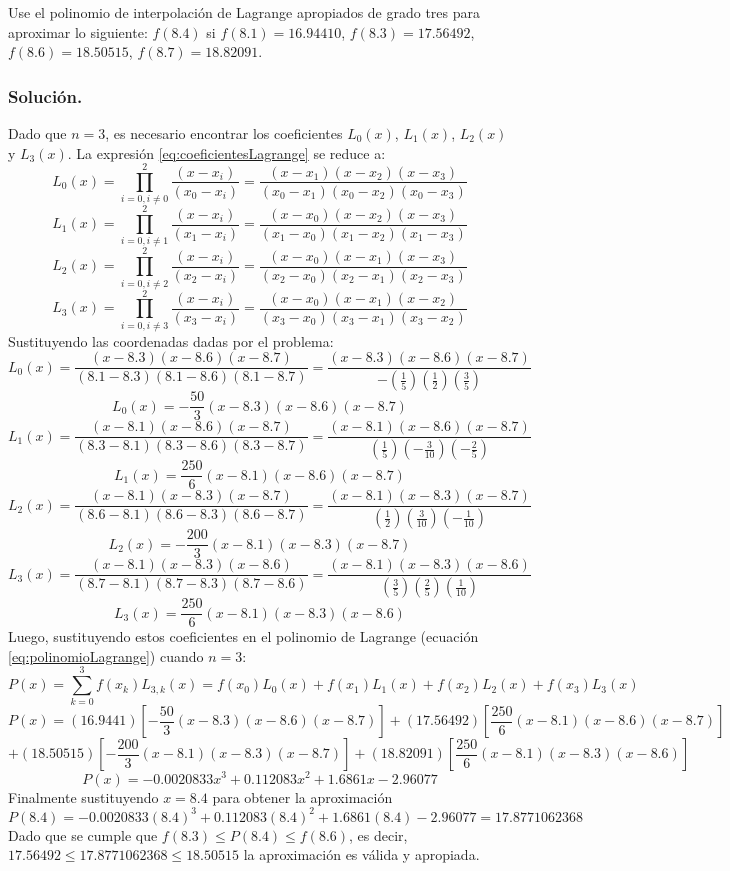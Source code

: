 \begin{exerciseT}
	Use el polinomio de interpolación de Lagrange apropiados de grado tres para aproximar lo siguiente: $f(8.4)$ si 
	$f(8.1)=16.94410$, $f(8.3)=17.56492$, $f(8.6)=18.50515$, $f(8.7)=18.82091$.
	\subsubsection*{Solución.} Dado que $n=3$, es necesario encontrar los coeficientes $L_0(x)$, $L_1(x)$, $L_2(x)$ y $L_3(x)$. 
	La expresión \ref{eq:coeficientesLagrange} 
		se reduce a:
			$$L_0(x) = \prod_{i=0, i\not= 0}^{2} \dfrac{(x-x_i)}{(x_0 - x_i)} = \dfrac{(x-x_1)(x-x_2)(x-x_3)}{(x_0-x_1)(x_0-x_2)(x_0-x_3)}$$	
			$$L_1(x) = \prod_{i=0, i\not= 1}^{2} \dfrac{(x-x_i)}{(x_1 - x_i)} = \dfrac{(x-x_0)(x-x_2)(x-x_3)}{(x_1-x_0)(x_1-x_2)(x_1-x_3)}$$	
			$$L_2(x) = \prod_{i=0, i\not= 2}^{2} \dfrac{(x-x_i)}{(x_2 - x_i)} = \dfrac{(x-x_0)(x-x_1)(x-x_3)}{(x_2-x_0)(x_2-x_1)(x_2-x_3)}$$
			$$L_3(x) = \prod_{i=0, i\not= 3}^{2} \dfrac{(x-x_i)}{(x_3 - x_i)} = \dfrac{(x-x_0)(x-x_1)(x-x_2)}{(x_3-x_0)(x_3-x_1)(x_3-x_2)}$$
		Sustituyendo las coordenadas dadas por el problema:
			$$L_0(x) = \dfrac{(x-8.3)(x-8.6)(x-8.7)}{(8.1-8.3)(8.1-8.6)(8.1-8.7)} = \dfrac{(x-8.3)(x-8.6)(x-8.7)}{-(\frac{1}{5})(\frac{1}{2})(\frac{3}{5})}$$
			$$L_0(x) = -\frac{50}{3}(x-8.3)(x-8.6)(x-8.7)$$
			$$L_1(x) = \dfrac{(x-8.1)(x-8.6)(x-8.7)}{(8.3-8.1)(8.3-8.6)(8.3-8.7)} = \dfrac{(x-8.1)(x-8.6)(x-8.7)}{(\frac{1}{5})(-\frac{3}{10})(-\frac{2}{5})}$$
			$$L_1(x) = \frac{250}{6}(x-8.1)(x-8.6)(x-8.7)$$
			$$L_2(x) = \dfrac{(x-8.1)(x-8.3)(x-8.7)}{(8.6-8.1)(8.6-8.3)(8.6-8.7)} = \dfrac{(x-8.1)(x-8.3)(x-8.7)}{(\frac{1}{2})(\frac{3}{10})(-\frac{1}{10})}$$
			$$L_2(x) = -\frac{200}{3}(x-8.1)(x-8.3)(x-8.7)$$
			$$L_3(x) = \dfrac{(x-8.1)(x-8.3)(x-8.6)}{(8.7-8.1)(8.7-8.3)(8.7-8.6)} = \dfrac{(x-8.1)(x-8.3)(x-8.6)}{(\frac{3}{5})(\frac{2}{5})(\frac{1}{10})}$$
			$$L_3(x) = \frac{250}{6}(x-8.1)(x-8.3)(x-8.6)$$	
		Luego, sustituyendo estos coeficientes en el polinomio de Lagrange (ecuación \ref{eq:polinomioLagrange}) cuando $n=3$:
			$$P(x) = \sum_{k=0}^3 f(x_k)L_{3,k}(x) = f(x_0)L_0(x) + f(x_1)L_1(x) + f(x_2)L_2(x) + f(x_3)L_3(x)$$
			$$P(x) = (16.9441)\left[-\frac{50}{3} (x-8.3)(x-8.6)(x-8.7) \right] + (17.56492)\left[\frac{250}{6} (x-8.1)(x-8.6)(x-8.7) \right]$$
			$$+ (18.50515)\left[-\frac{200}{3} (x-8.1)(x-8.3)(x-8.7) \right] + (18.82091)\left[\frac{250}{6} (x-8.1)(x-8.3)(x-8.6) \right]$$
			$$P(x) = -0.0020833x^3 + 0.112083x^2 + 1.6861x - 2.96077$$
		Finalmente sustituyendo $x=8.4$ para obtener la aproximación
			$$P(8.4) = -0.0020833(8.4)^3 + 0.112083(8.4)^2 + 1.6861(8.4) - 2.96077 = 17.8771062368$$
		Dado que se cumple que $f(8.3)\leq P(8.4)\leq f(8.6)$, es decir, $17.56492 \leq 17.8771062368 \leq 18.50515$ la aproximación es válida y apropiada.
		
\end{exerciseT}


